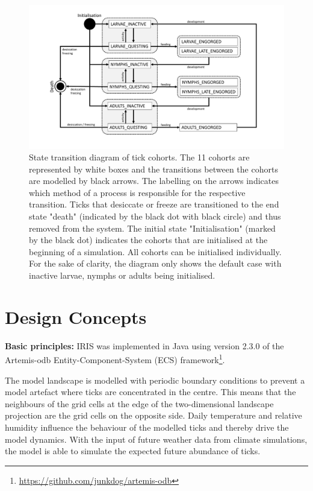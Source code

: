 \documentclass[a4paper, 11pt]{scrartcl}
\begin{document}
\begin{figure}[h!]
	\centering
	\includegraphics[width=\linewidth]{figures/iris_cohort_transitions.pdf}
	\caption[State transition diagram of tick cohorts]{State transition diagram of tick cohorts. The 11 cohorts are represented by white boxes and the transitions between the cohorts are modelled by black arrows. The labelling on the arrows indicates which method of a process is responsible for the respective transition. Ticks that desiccate or freeze are transitioned to the end state "death" (indicated by the black dot with black circle) and thus removed from the system. The initial state "Initialisation" (marked by the black dot) indicates the cohorts that are initialised at the beginning of a simulation. All cohorts can be initialised individually. For the sake of clarity, the diagram only shows the default case with inactive larvae, nymphs or adults being initialised.}
	\label{fig:iris_cohort_transitions}
\end{figure}

\newpage
\section{Design Concepts}\label{design_concepts}
\textbf{Basic principles:} IRIS was implemented in Java using version 2.3.0 of the Artemis-odb Entity-Component-System (ECS) framework\footnote{\url{https://github.com/junkdog/artemis-odb}}.

The model landscape is modelled with periodic boundary conditions to prevent a model artefact where ticks are concentrated in the centre. This means that the neighbours of the grid cells at the edge of the two-dimensional landscape projection are the grid cells on the opposite side. Daily temperature and relative humidity influence the behaviour of the modelled ticks and thereby drive the model dynamics. With the input of future weather data from climate simulations, the model is able to simulate the expected future abundance of ticks.
\end{document}

